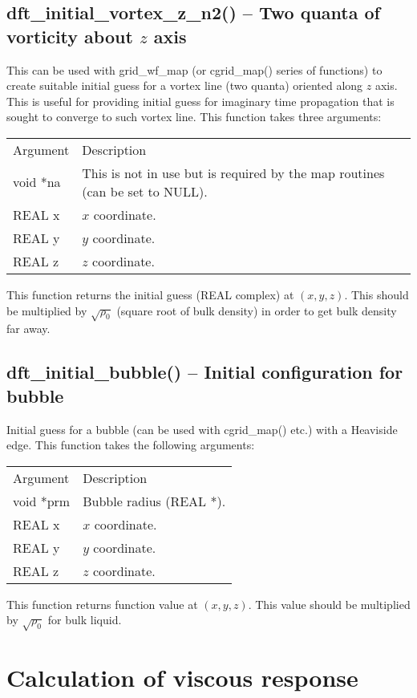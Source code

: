 \documentclass[12pt,letterpaper]{report}
\begin{document}
\subsection{dft\_initial\_vortex\_z\_n2() -- Two quanta of vorticity about $z$ axis}

This can be used with grid\_wf\_map (or cgrid\_map() series of functions) to create suitable initial guess for a vortex line (two quanta) oriented along $z$ axis. This is useful for providing initial guess for imaginary time propagation that is sought to converge to such vortex line. This function takes three arguments:
\begin{longtable}{p{} p{}}
Argument & Description\\
\cline{1-2}
void *na & This is not in use but is required by the map routines (can be set to NULL).\\
REAL x & $x$ coordinate.\\
REAL y & $y$ coordinate.\\
REAL z & $z$ coordinate.\\
\end{longtable}
\noindent
This function returns the initial guess (REAL complex) at $(x, y, z)$. This should be multiplied by $\sqrt{\rho_0}$ (square root of bulk density) in order to get bulk density far away. 

\subsection{dft\_initial\_bubble() -- Initial configuration for bubble}

Initial guess for a bubble (can be used with cgrid\_map() etc.) with a Heaviside edge. This function takes the following arguments:
\begin{longtable}{p{} p{}}
Argument & Description\\
\cline{1-2}
void *prm & Bubble radius (REAL *).\\
REAL x & $x$ coordinate.\\
REAL y & $y$ coordinate.\\
REAL z & $z$ coordinate.\\
\end{longtable}
\noindent
This function returns function value at $(x, y, z)$. This value should be multiplied by $\sqrt{\rho_0}$ for bulk liquid.

\section{Calculation of viscous response}
\end{document}
